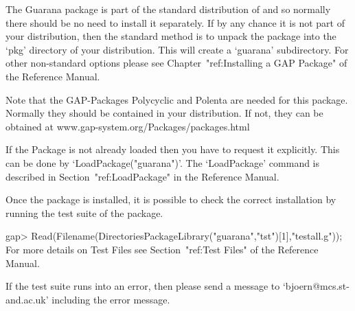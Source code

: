 
\null

The Guarana package is part of the standard distribution of {\GAP} and
so normally there should be no need to install it separately.
If by any chance it is not part of your {\GAP} distribution, then 
the standard method is to unpack	 the package into the `pkg'
directory  of your {\GAP} distribution.  This will create a `guarana'
subdirectory. 
For other non-standard options please see  Chapter~"ref:Installing a
GAP Package" of the {\GAP} Reference Manual.

Note that the GAP-Packages Polycyclic and Polenta
are needed for this package.
Normally they should be contained in your distribution. If not, 
they can be obtained at
\begintt
               www.gap-system.org/Packages/packages.html             

\endtt





\null

If the {\Guarana} Package is not already loaded 
then you have to request it explicitly. 
This  can be 
done by `LoadPackage("guarana")'.
The `LoadPackage' command is described in Section~"ref:LoadPackage"
in the {\GAP} Reference Manual.


    Once the package is installed, it is possible to check the correct
    installation by running the test suite of the package.

\beginexample
    gap> Read(Filename(DirectoriesPackageLibrary("guarana","tst")[1],"testall.g"));
\endexample
    For more details on  Test Files see 
    Section~"ref:Test Files" of the 
    {\GAP} Reference Manual.

    If the test suite runs into an error, 
    then please send a message
    to `bjoern@mcs.st-and.ac.uk' including the error message.



